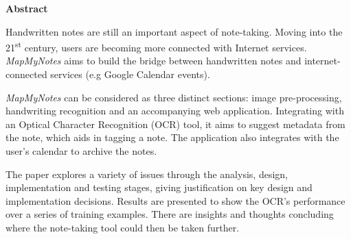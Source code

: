 \thispagestyle{empty}

\begin{center}
    {\LARGE\bf Abstract}
\end{center}


Handwritten notes are still an important aspect of note-taking. Moving into the 21\textsuperscript{st} century, users are becoming more connected with Internet services. \textit{MapMyNotes} aims to build the bridge between handwritten notes and internet-connected services (e.g Google Calendar events).

\textit{MapMyNotes} can be considered as three distinct sections: image pre-processing, handwriting recognition and an accompanying web application. Integrating with an Optical Character Recognition (OCR) tool, it aims to suggest metadata from the note, which aids in tagging a note. The application also integrates with the user's calendar to archive the notes.

The paper explores a variety of issues through the analysis, design, implementation and testing stages, giving justification on key design and implementation decisions. Results are presented to show the OCR's performance over a series of training examples. There are insights and thoughts concluding where the note-taking tool could then be taken further.
